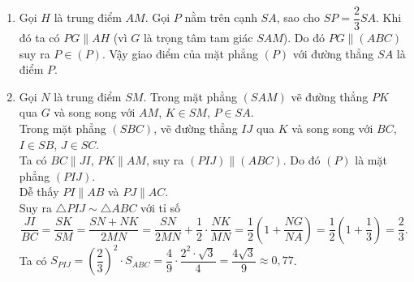 \begin{ex}
{\begin{center}
    \end{center}
\begin{enumerate}
	\item Gọi $H$ là trung điểm $AM$. Gọi $P$ nằm trên cạnh $SA$, sao cho $SP=\dfrac{2}{3}SA$. Khi đó ta có $PG\parallel AH$ (vì $G$ là trọng tâm tam giác $SAM$). Do đó $PG \parallel (ABC)$ suy ra $P\in (P)$. Vậy giao điểm của mặt phẳng $(P)$ với đường thẳng $SA$ là điểm $P$.
	\item Gọi $N$ là trung điểm $SM$. Trong mặt phẳng $(SAM)$ vẽ đường thẳng $PK$ qua $G$ và song song với $AM$, $K\in SM$, $P\in SA$. \\
Trong mặt phẳng $(SBC)$, vẽ đường thẳng $IJ$ qua $K$ và song song với $BC$, $I\in SB$, $J\in SC$. \\
Ta có $BC\parallel JI$, $PK  \parallel AM$, suy ra $(PIJ) \parallel (ABC)$. Do đó $(P)$ là mặt phẳng $(PIJ)$. \\
Dễ thấy $PI\parallel AB$ và $PJ \parallel AC$.\\ 
Suy ra $\triangle PIJ \sim \triangle ABC$ với tỉ số
$$
    \dfrac{JI}{BC}=\dfrac{SK}{SM} =\dfrac{SN+NK}{2MN} =\dfrac{SN}{2MN}+\dfrac{1}{2}\cdot\dfrac{NK}{MN} =\dfrac{1}{2}\left(1+\dfrac{NG}{NA}\right)=\dfrac{1}{2}\left(1+\dfrac{1}{3}\right)= \dfrac{2}{3}.
$$
Ta có  $S_{PIJ} = \left(\dfrac{2}{3}\right)^2\cdot S_{ABC} = \dfrac{4}{9}\cdot \dfrac{2^2 \cdot \sqrt{3}}{4} = \dfrac{4\sqrt{3}}{9}\approx 0{,}77$.
\end{enumerate}

    }
\end{ex}
